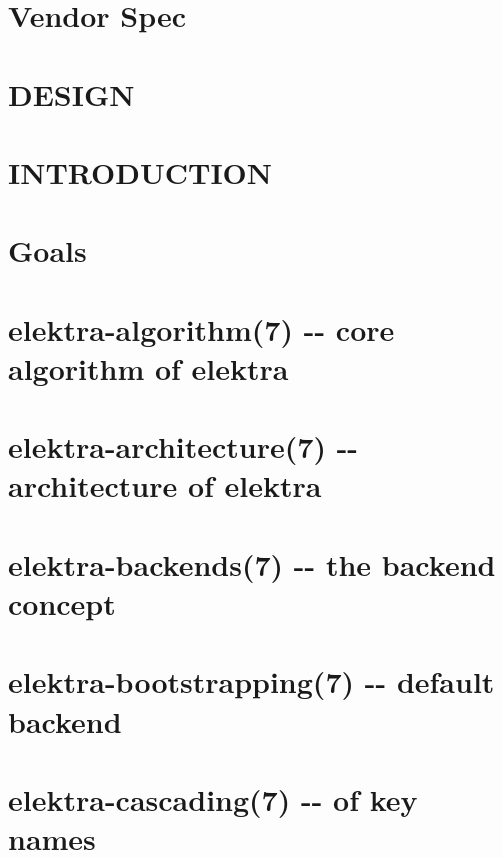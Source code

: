 \documentclass[twoside]{book}
\newcommand{\+}{\discretionary{\mbox{\scriptsize$\hookleftarrow$}}{}{}}
\begin{document}
\chapter{Vendor Spec}
\label{doc_decisions_vendor_spec_md}
\hypertarget{doc_decisions_vendor_spec_md}{}

\chapter{D\+E\+S\+I\+G\+N}
\label{doc_DESIGN_md}
\hypertarget{doc_DESIGN_md}{}

\chapter{I\+N\+T\+R\+O\+D\+U\+C\+T\+I\+O\+N}
\label{doc_GIT_md}
\hypertarget{doc_GIT_md}{}

\chapter{Goals}
\label{doc_GOALS_md}
\hypertarget{doc_GOALS_md}{}

\chapter{elektra-\/algorithm(7) -\/-\/ core algorithm of elektra}
\label{md_doc_help_elektra-algorithm}
\hypertarget{md_doc_help_elektra-algorithm}{}

\chapter{elektra-\/architecture(7) -\/-\/ architecture of elektra}
\label{md_doc_help_elektra-architecture}
\hypertarget{md_doc_help_elektra-architecture}{}

\chapter{elektra-\/backends(7) -\/-\/ the backend concept}
\label{md_doc_help_elektra-backends}
\hypertarget{md_doc_help_elektra-backends}{}

\chapter{elektra-\/bootstrapping(7) -\/-\/ default backend}
\label{md_doc_help_elektra-bootstrapping}
\hypertarget{md_doc_help_elektra-bootstrapping}{}

\chapter{elektra-\/cascading(7) -\/-\/ of key names}
\label{md_doc_help_elektra-cascading}
\hypertarget{md_doc_help_elektra-cascading}{}

\end{document}
